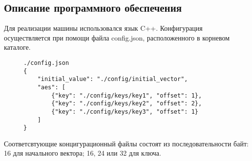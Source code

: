 
\subsection{Описание программного обеспечения}

Для реализации машины использовался язык C++. Конфигурация осуществляется
при помощи файла config.json, расположенного в корневом каталоге.

\begin{figure}[!h]
    \begin{verbatim}
./config.json
{
    "initial_value": "./config/initial_vector",
    "aes": [
        {"key": "./config/keys/key1", "offset": 1},
        {"key": "./config/keys/key2", "offset": 2},
        {"key": "./config/keys/key3", "offset": 1}
    ]
}
    \end{verbatim}
\end{figure}

Соответсвтующие концигурационный  файлы состоят из последовательности байт:
16 для начального вектора; 16, 24 или 32 для ключа.


